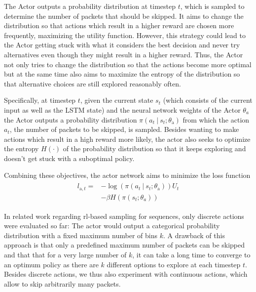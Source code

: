 \documentclass[conference]{IEEEtran}
\newcommand\givenbase[1][]{\:#1\lvert\:}
\let\given\givenbase
\begin{document}
The Actor outputs a probability distribution at timestep $t$, which is sampled to determine the number of packets that should be skipped. It aims to change the distribution so that actions which result in a higher reward are chosen more frequently, maximizing the utility function. However, this strategy could lead to the Actor getting stuck with what it considers the best decision and never try alternatives even though they might result in a higher reward. Thus, the Actor not only tries to change the distribution so that the actions become more optimal but at the same time also aims to maximize the entropy of the distribution so that alternative choices are still explored reasonably often. 

Specifically, at timestep $t$, given the current state $s_t$ (which consists of the current input as well as the LSTM state) and the neural network weights of the Actor $\theta_a$ the Actor outputs a probability distribution $\pi \left( a_t \given s_t ; \theta_\text{a} \right)$ from which the action $a_t$, the number of packets to be skipped, is sampled. Besides wanting to make actions which result in a high reward more likely, the actor also seeks to optimize the entropy $H(\cdot)$ of the probability distribution so that it keeps exploring and doesn't get stuck with a suboptimal policy. 

Combining these objectives, the actor network aims to minimize the loss function
\begin{align}
\begin{split}
l_{\text{a},t} =& -\log \left( \pi \left( a_t \given s_t ; \theta_\text{a} \right) \right) U_t \\ 
&- \beta H\left( \pi\left( s_t; \theta_a \right)\right)
\end{split}\label{eq:actor}
\end{align}


In related work regarding \gls{rl}-based sampling for sequences, only discrete actions were evaluated so far: The actor would output a categorical probability distribution with a fixed maximum number of bins $k$. A drawback of this approach is that only a predefined maximum number of packets can be skipped and that that for a very large number of $k$, it can take a long time to converge to an optimum policy as there are $k$ different options to explore at each timestep $t$. Besides discrete actions, we thus also experiment with continuous actions, which allow to skip arbitrarily many packets. 
\end{document}
